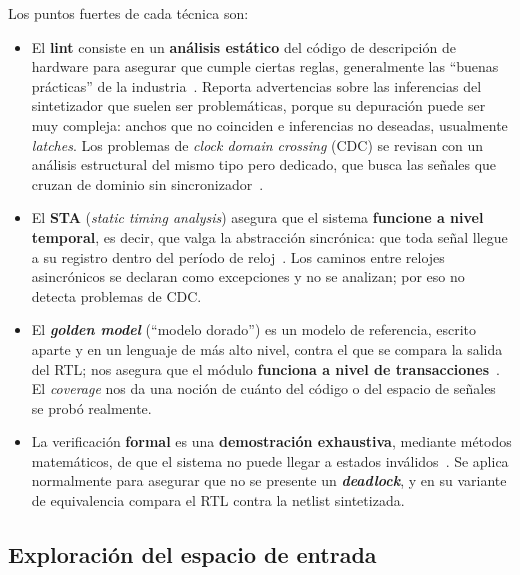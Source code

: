 Los puntos fuertes de cada técnica son:
\begin{itemize}
  \item El \textbf{lint} consiste en un \textbf{análisis estático} del código de
    descripción de hardware para asegurar que cumple ciertas reglas,
    generalmente las ``buenas prácticas'' de la industria~\cite{Keating2002}.
    Reporta advertencias sobre las inferencias del sintetizador que suelen ser
    problemáticas, porque su depuración puede ser muy compleja: anchos que no
    coinciden e inferencias no deseadas, usualmente \emph{latches}. Los problemas de
    \emph{clock domain crossing} (CDC) se revisan con un análisis estructural
    del mismo tipo pero dedicado, que busca las señales que cruzan de dominio
    sin sincronizador~\cite{Cummings2008}.
  \item El \textbf{STA} (\emph{static timing analysis}) asegura que el sistema
    \textbf{funcione a nivel temporal}, es decir, que valga la abstracción
    sincrónica: que toda señal llegue a su registro dentro del período de
    reloj~\cite{Bhasker2009}. Los caminos entre relojes asincrónicos se
    declaran como excepciones y no se analizan; por eso no detecta problemas de
    CDC.
  \item El \textbf{\emph{golden model}} (``modelo dorado'') es un modelo de referencia,
    escrito aparte y en un lenguaje de más alto nivel, contra el que se compara
    la salida del RTL; nos asegura que el módulo \textbf{funciona a nivel de
    transacciones}~\cite{Bergeron2003}. El \emph{coverage} nos da una noción de
    cuánto del código o del espacio de señales se probó realmente.
  \item La verificación \textbf{formal} es una \textbf{demostración
    exhaustiva}, mediante métodos matemáticos, de que el sistema no puede
    llegar a estados inválidos~\cite{Seligman2023}. Se aplica normalmente para
    asegurar que no se presente un \textbf{\emph{deadlock}}, y en su variante de
    equivalencia compara el RTL contra la netlist sintetizada.
\end{itemize}

\subsection{Exploración del espacio de entrada}
\label{S:intro-hw-formal}

